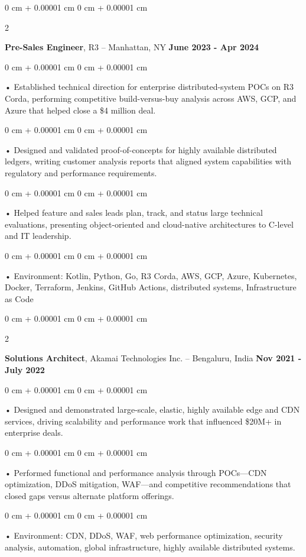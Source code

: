 \documentclass[10pt, letterpaper]{article}
\newenvironment{onecolentry}{
    \begin{adjustwidth}{
        0 cm + 0.00001 cm
    }{
        0 cm + 0.00001 cm
    }
}{
    \end{adjustwidth}
} %
\newenvironment{twocolentry}[2][]{
    \onecolentry
    \def\secondColumn{#2}
    \setcolumnwidth{\fill, 4.5 cm}
    \begin{paracol}{2}
}{
    \switchcolumn \raggedleft \secondColumn
    \end{paracol}
    \endonecolentry
} %
\begin{document}
        \begin{twocolentry}{
            \textbf{June 2023 - Apr 2024}
        }
            \textbf{Pre-Sales Engineer}, R3 -- Manhattan, NY\end{twocolentry}


        \begin{onecolentry}
             • Established technical direction for enterprise distributed-system POCs on R3 Corda, performing competitive build-versus-buy analysis across AWS, GCP, and Azure that helped close a \$4 million deal.
        \end{onecolentry}
        \begin{onecolentry}
             • Designed and validated proof-of-concepts for highly available distributed ledgers, writing customer analysis reports that aligned system capabilities with regulatory and performance requirements.
        \end{onecolentry}
        \begin{onecolentry}
             • Helped feature and sales leads plan, track, and status large technical evaluations, presenting object-oriented and cloud-native architectures to C-level and IT leadership.
        \end{onecolentry}
        \begin{onecolentry}
             • Environment: Kotlin, Python, Go, R3 Corda, AWS, GCP, Azure, Kubernetes, Docker, Terraform, Jenkins, GitHub Actions, distributed systems, Infrastructure as Code
        \end{onecolentry}
        \vspace{0.1cm}

        \begin{twocolentry}{
            \textbf{Nov 2021 - July 2022}
        }
            \textbf{Solutions Architect}, Akamai Technologies Inc. -- Bengaluru, India \end{twocolentry}
        \begin{onecolentry}
            • Designed and demonstrated large-scale, elastic, highly available edge and CDN services, driving scalability and performance work that influenced \$20M+ in enterprise deals.
        \end{onecolentry}
        \begin{onecolentry}
            • Performed functional and performance analysis through POCs---CDN optimization, DDoS mitigation, WAF---and competitive recommendations that closed gaps versus alternate platform offerings.
        \end{onecolentry}
        \begin{onecolentry}
             • Environment: CDN, DDoS, WAF, web performance optimization, security analysis, automation, global infrastructure, highly available distributed systems.
        \end{onecolentry}
\end{document}
